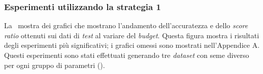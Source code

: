 
\subsubsection{Esperimenti utilizzando la strategia 1}
La~ mostra dei grafici che mostrano l'andamento dell'accuratezza e dello \emph{score ratio} ottenuti sui dati di \emph{test} al variare del \emph{budget}.
Questa figura mostra i risultati degli esperimenti più significativi; i grafici omessi sono mostrati nell'Appendice A.
Questi esperimenti sono stati effettuati generando tre \emph{dataset} con seme diverso per ogni gruppo di parametri ().

